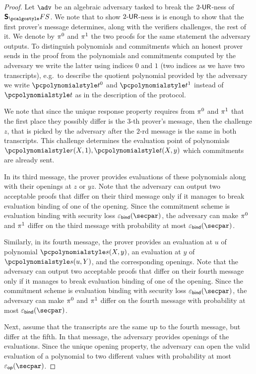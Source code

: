 \begin{proof}
  Let $\adv$ be an algebraic adversary tasked to break the ${2\text{-}\mathsf{UR}}$-ness of
  $\sonicprotfs$. We note that to show ${2\text{-}\mathsf{UR}}$-ness is is enough to show that the first prover's message determines, along with the verifiers challenges, the rest of it. 
  We denote by $\pi^0$ and $\pi^1$ the two proofs for the same statement the adversary outputs.
  To distinguish polynomials and commitments which an honest prover sends in the
  proof from the polynomials and commitments computed by the adversary we write the latter using indices $0$ and $1$ (two indices as we have two transcripts), e.g.~to describe the quotient polynomial provided by the adversary we write $\p{t}^0$ and   $\p{t}^1$ instead of $\p{t}$ as in the description of the protocol.

  We note that since the unique response property requires from $\pi^{0}$ and $\pi^{1}$ that the first place they possibly differ is the $3$-th prover's message, then the challenge $z$, that is picked by the adversary after the $2$-rd message is the same in both transcripts. This challenge determines the evaluation point of polynomials $\p{r}(X, 1), \p{t}(X, y)$ which commitments are already sent.

  In its third message, the prover provides evaluations of these polynomials along with their openings at $z$ or $yz$. Note that the adversary can output two acceptable proofs that differ on their third message only if it  manages to break evaluation binding of one of the opening. Since the commitment scheme is evaluation binding with security loss $\epsbinding (\secpar)$, the adversary can make $\pi^{0}$ and $\pi^{1}$ differ on the third message with probability at most $\epsbinding (\secpar) $. 

  Similarly, in its fourth message, the prover provides an evaluation at $u$ of polynomial $\p{s}(X, y)$, an evaluation at $y$ of $\p{s} (u, Y)$, and the corresponding openings. Note that the adversary can output two acceptable proofs that differ on their fourth message only if it manages to break evaluation binding of one of the opening. Since the commitment scheme is evaluation binding with security loss $\epsbinding (\secpar)$, the adversary can make $\pi^{0}$ and $\pi^{1}$ differ on the fourth message with probability at most $\epsbinding (\secpar) $. 

  Next, assume that the transcripts are the same up to the fourth message, but differ at the fifth. In that message, the adversary provides openings of the evaluations. Since the unique opening property, the adversary can open the valid evaluation of a polynomial to two different values with probability at most $\epsop (\secpar)$.%


\end{proof}
